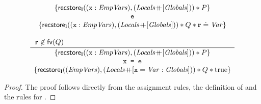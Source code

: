 \documentclass{article}
\begin{document}
\begin{lemma}
        \label{lem:recstore:destricvarinit}
        \[\frac{
        \begin{array}{l}
                \begin{array}{c} 
                        \{\recstore_{\ls}((\js{x}:\E{EmpVars}) , (\E{Locals}{\append}[\E{Globals}])) \sep P \}\\
                        \js{e}\\
                        \{ \recstore_{\ls}((\js{x}:\E{EmpVars}) , (\E{Locals}{\append}[\E{Globals}])) \sep Q \sep \rv\doteq\E{Var} \} \\
                \end{array}\\
                \\
                \rv\not\in\fv(Q)
        \end{array}
        }{\begin{array}{c}
                \{ \recstore_{\ls}((\js{x}:\E{EmpVars}) , (\E{Locals}{\append}[\E{Globals}])) \sep P \} \\
                \js{x = e}\\
                \{ \recstore_{\ls}((\E{EmpVars}) , (\E{Locals}{\append}[\js{x}=\E{Var}:\E{Globals}])) \sep Q \sep \true \} \\
        \end{array}
        }\]
        \begin{proof} The proof follows directly from the assignment rules, the definition of \recstore and the rules for \store.\end{proof}
\end{lemma}
\end{document}
